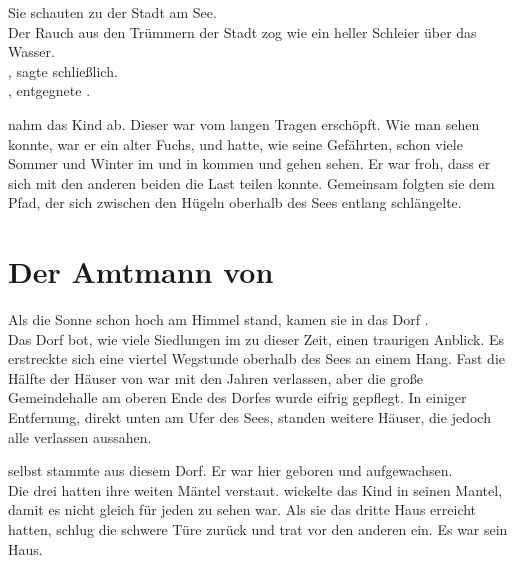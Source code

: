 \begin{Large}
Sie schauten zu der Stadt am See.\\
Der Rauch aus den Trümmern der Stadt {\Tern} zog wie ein heller Schleier über das Wasser.\\
, sagte {\Nox} schließlich.  
\\
, entgegnete {\Bomar}.\\

{\Bomar} nahm {\Eno} das Kind ab. Dieser war vom langen Tragen erschöpft. Wie man sehen konnte, war er ein alter Fuchs, und hatte, wie seine Gefährten, schon viele Sommer und Winter im {\Enland} und in {\Rhingell} kommen und gehen sehen. Er war froh, dass er sich mit den anderen beiden die Last teilen konnte. Gemeinsam folgten sie dem Pfad, der sich zwischen den Hügeln oberhalb des Sees entlang schlängelte.

\chapter{Der Amtmann von {\Berna}}
Als die Sonne schon hoch am Himmel stand, kamen sie in das Dorf {\Berna}.\\
Das Dorf bot, wie viele Siedlungen im {\Enland} zu dieser Zeit, einen traurigen Anblick. Es erstreckte sich eine viertel Wegstunde oberhalb des Sees an einem Hang. Fast die Hälfte der Häuser von {\Berna} war mit den Jahren verlassen, aber die große Gemeindehalle am oberen Ende des Dorfes wurde eifrig gepflegt. In einiger Entfernung, direkt unten am Ufer des Sees, standen weitere Häuser, die jedoch alle verlassen aussahen.

{\Bomar} selbst stammte aus diesem Dorf. Er war hier geboren und aufgewachsen.\\
Die drei {\Schattenlaufer} hatten ihre weiten Mäntel verstaut. {\Eno} wickelte das Kind in seinen Mantel, damit es nicht gleich für jeden zu sehen war. Als sie das dritte Haus erreicht hatten, schlug {\Bomar} die schwere Türe zurück und trat vor den anderen ein. Es war sein Haus.


\end{Large}
